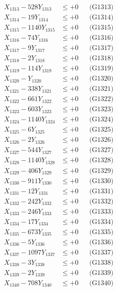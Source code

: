 \documentclass[a4paper,10pt]{article}
\begin{document}
{\begin{align}
X_{1313} - 528Y_{1313} &\leq +0 && \text{(G1313)} \\
X_{1314} - 19Y_{1314} &\leq +0 && \text{(G1314)} \\
X_{1315} - 1140Y_{1315} &\leq +0 && \text{(G1315)} \\
X_{1316} - 74Y_{1316} &\leq +0 && \text{(G1316)} \\
X_{1317} - 9Y_{1317} &\leq +0 && \text{(G1317)} \\
X_{1318} - 2Y_{1318} &\leq +0 && \text{(G1318)} \\
X_{1319} - 114Y_{1319} &\leq +0 && \text{(G1319)} \\
X_{1320} - Y_{1320} &\leq +0 && \text{(G1320)} \\
\allowbreak
X_{1321} - 338Y_{1321} &\leq +0 && \text{(G1321)} \\
X_{1322} - 661Y_{1322} &\leq +0 && \text{(G1322)} \\
X_{1323} - 603Y_{1323} &\leq +0 && \text{(G1323)} \\
X_{1324} - 1140Y_{1324} &\leq +0 && \text{(G1324)} \\
X_{1325} - 6Y_{1325} &\leq +0 && \text{(G1325)} \\
X_{1326} - 2Y_{1326} &\leq +0 && \text{(G1326)} \\
X_{1327} - 544Y_{1327} &\leq +0 && \text{(G1327)} \\
X_{1328} - 1140Y_{1328} &\leq +0 && \text{(G1328)} \\
X_{1329} - 406Y_{1329} &\leq +0 && \text{(G1329)} \\
X_{1330} - 911Y_{1330} &\leq +0 && \text{(G1330)} \\
\allowbreak
X_{1331} - 12Y_{1331} &\leq +0 && \text{(G1331)} \\
X_{1332} - 242Y_{1332} &\leq +0 && \text{(G1332)} \\
X_{1333} - 246Y_{1333} &\leq +0 && \text{(G1333)} \\
X_{1334} - 17Y_{1334} &\leq +0 && \text{(G1334)} \\
X_{1335} - 673Y_{1335} &\leq +0 && \text{(G1335)} \\
X_{1336} - 5Y_{1336} &\leq +0 && \text{(G1336)} \\
X_{1337} - 1097Y_{1337} &\leq +0 && \text{(G1337)} \\
X_{1338} - 3Y_{1338} &\leq +0 && \text{(G1338)} \\
X_{1339} - 2Y_{1339} &\leq +0 && \text{(G1339)} \\
X_{1340} - 708Y_{1340} &\leq +0 && \text{(G1340)} \\

\end{align}}
\end{document}
